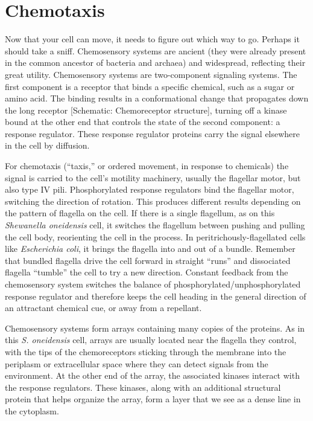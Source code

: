 \documentclass[]{tufte-book}
\begin{document}
\hypertarget{chemotaxis}{%
\section{Chemotaxis}\label{chemotaxis}}

Now that your cell can move, it needs to figure out which way to go. Perhaps it should take a sniff. Chemosensory systems are ancient (they were already present in the common ancestor of bacteria and archaea) and widespread, reflecting their great utility. Chemosensory systems are two-component signaling systems. The first component is a receptor that binds a specific chemical, such as a sugar or amino acid. The binding results in a conformational change that propagates down the long receptor {[}Schematic: Chemoreceptor structure{]}, turning off a kinase bound at the other end that controls the state of the second component: a response regulator. These response regulator proteins carry the signal elsewhere in the cell by diffusion.

For chemotaxis (``taxis,'' or ordered movement, in response to chemicals) the signal is carried to the cell's motility machinery, usually the flagellar motor, but also type IV pili. Phosphorylated response regulators bind the flagellar motor, switching the direction of rotation. This produces different results depending on the pattern of flagella on the cell. If there is a single flagellum, as on this \emph{Shewanella oneidensis} cell, it switches the flagellum between pushing and pulling the cell body, reorienting the cell in the process. In peritrichously-flagellated cells like \emph{Escherichia coli}, it brings the flagella into and out of a bundle. Remember that bundled flagella drive the cell forward in straight ``runs'' and dissociated flagella ``tumble'' the cell to try a new direction. Constant feedback from the chemosensory system switches the balance of phosphorylated/unphosphorylated response regulator and therefore keeps the cell heading in the general direction of an attractant chemical cue, or away from a repellant.

Chemosensory systems form arrays containing many copies of the proteins. As in this \emph{S. oneidensis} cell, arrays are usually located near the flagella they control, with the tips of the chemoreceptors sticking through the membrane into the periplasm or extracellular space where they can detect signals from the environment. At the other end of the array, the associated kinases interact with the response regulators. These kinases, along with an additional structural protein that helps organize the array, form a layer that we see as a dense line in the cytoplasm.
\end{document}
